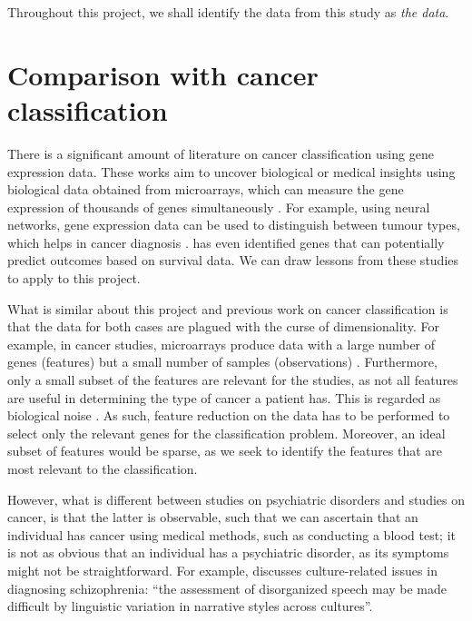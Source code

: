 \documentclass[12pt, twoside, a4paper]{report}
\begin{document}
Throughout this project, we shall identify the data from this study as \textit{the data}.


\section{Comparison with cancer classification} \label{bg:cancer}

There is a significant amount of literature on cancer classification using gene expression data. These works aim to uncover biological or medical insights using biological data obtained from microarrays, which can measure the gene expression of thousands of genes simultaneously \citep{RefWorks:79}. For example, using neural networks, gene expression data can be used to distinguish between tumour types, which helps in cancer diagnosis \citep{RefWorks:80, RefWorks:88}. \cite{RefWorks:199} has even identified genes that can potentially predict outcomes based on survival data. We can draw lessons from these studies to apply to this project.

What is similar about this project and previous work on cancer classification is that the data for both cases are plagued with the curse of dimensionality. For example, in cancer studies, microarrays produce data with a large number of genes (features) but a small number of samples (observations) \cite{RefWorks:88}. Furthermore, only a small subset of the features are relevant for the studies, as not all features are useful in determining the type of cancer a patient has. This is regarded as biological noise \cite{RefWorks:89}. As such, feature reduction on the data has to be performed to select only the relevant genes for the classification problem. Moreover, an ideal subset of features would be sparse, as we seek to identify the features that are most relevant to the classification.

However, what is different between studies on psychiatric disorders and studies on cancer, is that the latter is observable, such that we can ascertain that an individual has cancer using medical methods, such as conducting a blood test; it is not as obvious that an individual has a psychiatric disorder, as its symptoms might not be straightforward. For example, \cite{RefWorks:114} discusses culture-related issues in diagnosing schizophrenia: ``the assessment of disorganized speech may be made difficult by linguistic variation in narrative styles across cultures''.

\end{document}
